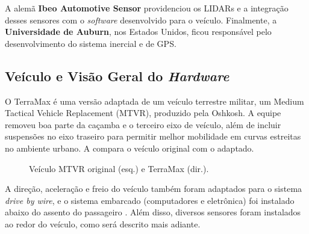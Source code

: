 A alemã \textbf{Ibeo Automotive Sensor} providenciou os LIDARs e a integração desses sensores com o \emph{software} desenvolvido para o veículo. Finalmente, a \textbf{Universidade de Auburn}, nos Estados Unidos, ficou responsável pelo desenvolvimento do sistema inercial e de GPS.

\subsection{Veículo e Visão Geral do \emph{Hardware}}

O TerraMax é uma versão adaptada de um veículo terrestre militar, um Medium Tactical Vehicle Replacement (MTVR), produzido pela Oshkosh. A equipe removeu boa parte da caçamba e o terceiro eixo de veículo, além de incluir suspensões no eixo traseiro para permitir melhor mobilidade em curvas estreitas no ambiente urbano. A  compara o veículo original com o adaptado.

\begin{figure}[h]
\centering
{}\enskip
{}
\caption{Veículo MTVR original (esq.) e TerraMax (dir.).}%
\label{fig:veiculo}%
\end{figure}

A direção, aceleração e freio do veículo também foram adaptados para o sistema \emph{drive by wire}, e o sistema embarcado (computadores e eletrônica) foi instalado abaixo do assento do passageiro . Além disso, diversos sensores foram instalados ao redor do veículo, como será descrito mais adiante.

